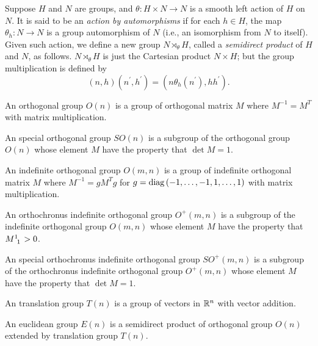 \documentclass[stu, babel, american, biblatex, a4paper, leqno, draftall]{apa7}
\begin{document}
\begin{definition}\label{Group:SemidirectProduct}
    Suppose $H$ and $N$ are groups,
    and $\theta:H\times N\to N$ is a smooth left action of $H$ on $N$.
    It is said to be an \textit{action by automorphisms}
    if for each $h\in H$, the map $\theta_h:N\to N$ is a group automorphism of $N$ (i.e., an isomorphism from $N$ to itself).
    Given such action, we define a new group $N\rtimes_\theta H$,
    called a \textit{semidirect product} of $H$ and $N$, as follows.
    $N\rtimes_\theta H$ is just the Cartesian product $N\times H$;
    but the group multiplication is defined by
    $$\left(n,h\right)\left(n^\prime,h^\prime\right)=\left(n\theta_h\left(n^\prime\right),hh^\prime\right)\text{.}$$
\end{definition}

\begin{definition}\label{OrthogonalGroup}
    An orthogonal group $O\left(n\right)$ is a group of orthogonal matrix $M$ where $M^{-1}=M^T$ with matrix multiplication.
\end{definition}
\begin{definition}\label{SpecialOrthogonalGroup}
    An special orthogonal group $SO\left(n\right)$ is a subgroup of the orthogonal group $O\left(n\right)$ whose element $M$ have the property that $\det{M}=1$.
\end{definition}
\begin{definition}\label{IndefiniteOrthogonalGroup}
    An indefinite orthogonal group $O\left(m,n\right)$ is a group of indefinite orthogonal matrix $M$ where $M^{-1}=gM^Tg$ for $g=\operatorname{diag}{\left(-1,\dots,-1,1,\dots,1\right)}$ with matrix multiplication.
\end{definition}
\begin{definition}\label{OrthochronusIndefiniteOrthogonalGroup}
    An orthochronus indefinite orthogonal group $O^+\left(m,n\right)$ is a subgroup of the indefinite orthogonal group $O\left(m,n\right)$ whose element $M$ have the property that $\tensor{M}{^1_1}>0$.
\end{definition}
\begin{definition}\label{SpecialOrthochronusIndefiniteOrthogonalGroup}
    An special orthochronus indefinite orthogonal group $SO^+\left(m,n\right)$ is a subgroup of the orthochronus indefinite orthogonal group $O^+\left(m,n\right)$ whose element $M$ have the property that $\det{M}=1$.
\end{definition}
\begin{definition}\label{TranslationGroup}
    An translation group $T\left(n\right)$ is a group of vectors in $\mathbb{R}^n$ with vector addition.
\end{definition}
\begin{definition}\label{EuclideanGroup}
    An euclidean group $E\left(n\right)$ is a semidirect product of orthogonal group $O\left(n\right)$ extended by translation group $T\left(n\right)$.
\end{definition}
\end{document}
